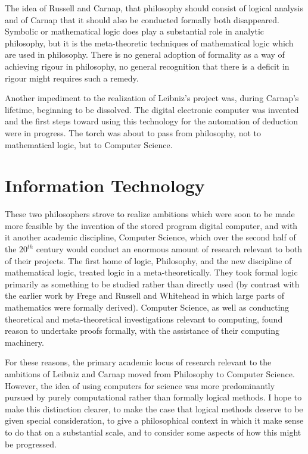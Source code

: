 The idea of Russell and Carnap, that philosophy should consist of
logical analysis and of Carnap that it should also be conducted
formally both disappeared. 
Symbolic or mathematical logic does play a substantial role in
analytic philosophy, but it is the meta-theoretic techniques of
mathematical logic which are used in philosophy. 
There is no general adoption of formality as a way of achieving rigour
in philosophy, no general recognition that there is a deficit in
rigour might requires such a remedy. 

Another impediment to the realization of Leibniz's project was, during
Carnap's lifetime, beginning to be dissolved. 
The digital electronic computer was invented and the first steps
toward using this technology for the automation of deduction were in
progress. 
The torch was about to pass from philosophy, not to mathematical
logic, but to Computer Science. 

\section{Information Technology}

These two philosophers strove to realize ambitions which were soon to
be made more feasible by the invention of the stored program digital
computer, and with it another academic discipline, Computer Science,
which over the second half of the $20^{th}$ century would conduct an
enormous amount of research relevant to both of their projects.
The first home of logic, Philosophy, and the new discipline of
mathematical logic, treated logic in a meta-theoretically.
They took formal logic primarily as something to be studied rather
than directly used (by contrast with the earlier work by Frege and
Russell and Whitehead in which large parts of mathematics were
formally derived).
Computer Science, as well as conducting theoretical and
meta-theoretical investigations relevant to computing, found reason to
undertake proofs formally, with the assistance of their computing
machinery.

For these reasons, the primary academic locus of research relevant to the
ambitions of Leibniz and Carnap moved from Philosophy to Computer
Science.
However, the idea of using computers for science was more
predominantly pursued by purely computational rather than formally
logical methods.
I hope to make this distinction clearer, to make the case that
logical methods deserve to be given special consideration, to give a
philosophical context in which it make sense to do that on a
substantial scale, and to consider some aspects of how this might be progressed.

